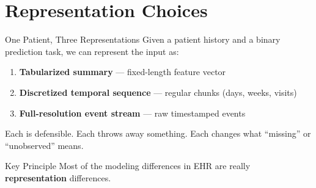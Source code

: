 \documentclass[aspectratio=169,10pt]{beamer}
\begin{document}
\section{Representation Choices}

\begin{frame}{One Patient, Three Representations}
Given a patient history and a binary prediction task, we can represent the input as:
\begin{enumerate}[<+->]
    \item \textbf{Tabularized summary} --- fixed-length feature vector
    \item \textbf{Discretized temporal sequence} --- regular chunks (days, weeks, visits)
    \item \textbf{Full-resolution event stream} --- raw timestamped events
\end{enumerate}
\vspace{0.3em}
Each is defensible. Each throws away something. Each changes what ``missing'' or ``unobserved'' means.
\vspace{0.2em}
\begin{block}{Key Principle}
Most of the modeling differences in EHR are really \textbf{representation} differences.
\end{block}
\end{frame}

\end{document}
